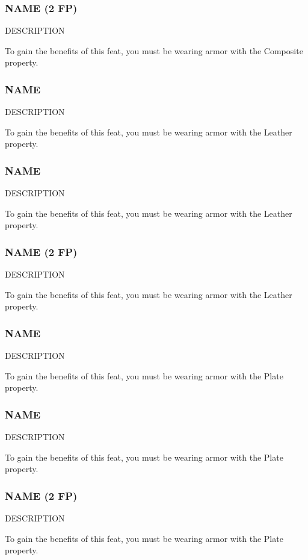 \subsubsection{NAME (2 FP)} \label{feat::name}
    DESCRIPTION

    To gain the benefits of this feat, you must be wearing armor with the Composite property.
\subsubsection{NAME} \label{feat::name}
    DESCRIPTION

    To gain the benefits of this feat, you must be wearing armor with the Leather property.
\subsubsection{NAME} \label{feat::name}
    DESCRIPTION

    To gain the benefits of this feat, you must be wearing armor with the Leather property.
\subsubsection{NAME (2 FP)} \label{feat::name}
    DESCRIPTION

    To gain the benefits of this feat, you must be wearing armor with the Leather property.
\subsubsection{NAME} \label{feat::name}
    DESCRIPTION

    To gain the benefits of this feat, you must be wearing armor with the Plate property.
\subsubsection{NAME} \label{feat::name}
    DESCRIPTION

    To gain the benefits of this feat, you must be wearing armor with the Plate property.
\subsubsection{NAME (2 FP)} \label{feat::name}
    DESCRIPTION

    To gain the benefits of this feat, you must be wearing armor with the Plate property.

